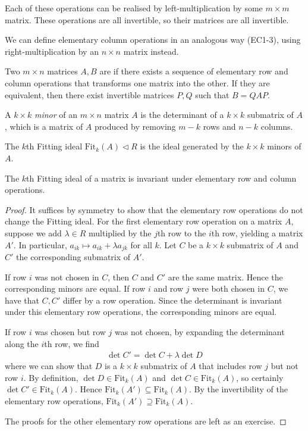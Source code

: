 \begin{remark}
	Each of these operations can be realised by left-multiplication by some $m \times m$ matrix.
	These operations are all invertible, so their matrices are all invertible.

	We can define elementary column operations in an analogous way (EC1-3), using right-multiplication by an $n \times n$ matrix instead.
\end{remark} 

\begin{definition}[Equivalent]
	Two $m \times n$ matrices $A, B$ are  if there exists a sequence of elementary row and column operations that transforms one matrix into the other.
	If they are equivalent, then there exist invertible matrices $P, Q$ such that $B = QAP$.
\end{definition}

\begin{definition}
	A $k \times k$ \textit{minor} of an $m \times n$ matrix $A$ is the determinant of a $k \times k$ submatrix of $A$, which is a matrix of $A$ produced by removing $m-k$ rows and $n-k$ columns.

	The $k$th Fitting ideal $\mathrm{Fit}_k(A) \triangleleft R$ is the ideal generated by the $k \times k$ minors of $A$.
\end{definition}
\begin{lemma}
	The $k$th Fitting ideal of a matrix is invariant under elementary row and column operations.
\end{lemma}
\begin{proof}
	It suffices by symmetry to show that the elementary row operations do not change the Fitting ideal.
	For the first elementary row operation on a matrix $A$, suppose we add $\lambda \in R$ multiplied by the $j$th row to the $i$th row, yielding a matrix $A'$.
	In particular, $a_{ik} \mapsto a_{ik} + \lambda a_{jk}$ for all $k$.
	Let $C$ be a $k \times k$ submatrix of $A$ and $C'$ the corresponding submatrix of $A'$.

	If row $i$ was not chosen in $C$, then $C$ and $C'$ are the same matrix.
	Hence the corresponding minors are equal.
	If row $i$ and row $j$ were both chosen in $C$, we have that $C, C'$ differ by a row operation.
	Since the determinant is invariant under this elementary row operations, the corresponding minors are equal.

	If row $i$ was chosen but row $j$ was not chosen, by expanding the determinant along the $i$th row, we find
	\begin{align*}
		\det C' = \det C + \lambda \det D
	\end{align*}
	where we can show that $D$ is a $k \times k$ submatrix of $A$ that includes row $j$ but not row $i$.
	By definition, $\det D \in \mathrm{Fit}_k(A)$ and $\det C \in \mathrm{Fit}_k(A)$, so certainly $\det C' \in \mathrm{Fit}_k(A)$.
	Hence $\mathrm{Fit}_k(A') \subseteq \mathrm{Fit}_k(A)$.
	By the invertibility of the elementary row operations, $\mathrm{Fit}_k(A') \supseteq \mathrm{Fit}_k(A)$.

	The proofs for the other elementary row operations are left as an exercise.
\end{proof}


